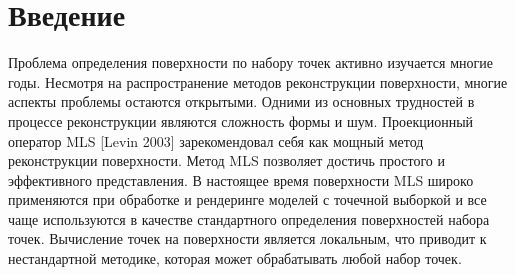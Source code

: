 \section*{Введение} 
Проблема определения поверхности по набору точек активно изучается многие годы. Несмотря на распространение методов реконструкции поверхности, многие аспекты проблемы остаются открытыми. Одними из основных трудностей в процессе реконструкции являются сложность формы и шум.  Проекционный оператор MLS [Levin 2003] зарекомендовал себя как мощный метод реконструкции поверхности. 
Метод MLS позволяет достичь простого и эффективного представления. В настоящее время поверхности MLS широко применяются при обработке и рендеринге моделей с точечной выборкой и все чаще используются в качестве стандартного определения поверхностей набора точек.  Вычисление точек на поверхности является локальным, что приводит к нестандартной методике, которая может обрабатывать любой набор точек.




